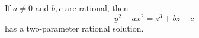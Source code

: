 \begin{proposition}
    If $a\ne0$ and $b,c$ are rational, then
\[
    y^2-ax^2=z^3+bz+c
\]
    has a two-parameter rational solution.
\end{proposition}
